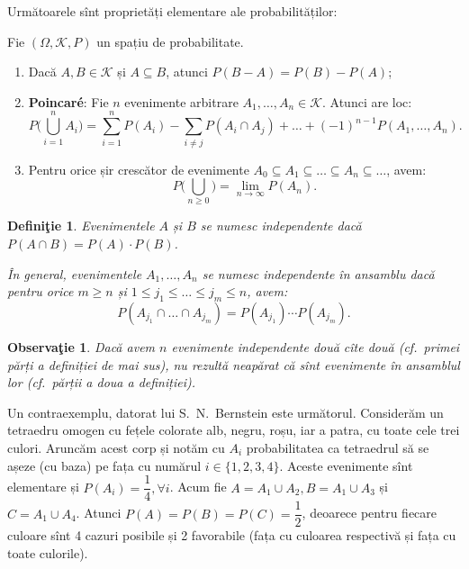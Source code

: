\documentclass[12pt,a4paper]{article}
\newcommand\kal{\mathcal}
\newcommand\seq{\subseteq}
\theoremstyle{dotless}
\theoremstyle{dotlessdr}
\newtheorem{definition}{Defini\c{t}ie}
\newtheorem{remark}{Observa\c{t}ie}
\begin{document}
\vspace{1cm}

Următoarele sînt proprietăți elementare ale probabilităților:

Fie $ (\Omega, \kal{K}, P) $ un spațiu de probabilitate.
\begin{enumerate}[(1)]
\item Dacă $ A, B \in \kal{K} $ și $ A \seq B $, atunci $ P(B - A) = P(B) - P(A) $;
\item \textbf{Poincar\'{e}}: Fie $ n $ evenimente arbitrare $ A_1, \dots, A_n \in \kal{K} $.
  Atunci are loc:
  \[
    P \Big( \bigcup_{i = 1}^n A_i \Big) = \sum_{i = 1}^n P(A_i) - \sum_{i \neq j} P(A_i \cap A_j) + %
    \dots + (-1)^{n-1} P(A_1, \dots, A_n).
  \]
\item Pentru orice șir crescător de evenimente $ A_0 \seq A_1 \seq \dots \seq A_n \seq \dots $,
  avem:
  \[
    P \Big( \bigcup_{n\geq 0} \Big) = \lim_{n \to \infty} P(A_n).
  \]
\end{enumerate}

\begin{definition}\label{def:ev-indep}
  Evenimentele $ A $ și $ B $ se numesc \emph{independente} dacă $ P(A \cap B) = P(A) \cdot P(B) $.

  În general, evenimentele $ A_1, \dots, A_n $ se numesc \emph{independente în ansamblu}
  dacă pentru orice $ m \geq n $ și $ 1 \leq j_1 \leq \dots \leq j_m \leq n $, avem:
  \[
    P(A_{j_1} \cap \dots \cap A_{j_m}) = P(A_{j_1}) \cdots P(A_{j_m}).
  \]
\end{definition}

\begin{remark}\label{rk:indep-ans}
  Dacă avem $ n $ evenimente independente două cîte două (cf.\ primei părți a definiției
  de mai sus), nu rezultă neapărat că sînt evenimente în ansamblul lor (cf.\ părții a
  doua a definiției).
\end{remark}

Un contraexemplu, datorat lui S.\ N.\ Bernstein este următorul. Considerăm un tetraedru
omogen cu fețele colorate alb, negru, roșu, iar a patra, cu toate cele trei culori.
Aruncăm acest corp și notăm cu $ A_i $ probabilitatea ca tetraedrul să se așeze (cu baza)
pe fața cu numărul $ i \in \{ 1, 2, 3, 4 \} $. Aceste evenimente sînt elementare și
$ P(A_i) = \dfrac{1}{4}, \forall i $. Acum fie $ A = A_1 \cup A_2, B = A_1 \cup A_3 $ și
$ C = A_1 \cup A_4 $. Atunci $ P(A) = P(B) = P(C) = \dfrac{1}{2} $, deoarece pentru fiecare
culoare sînt 4 cazuri posibile și 2 favorabile (fața cu culoarea respectivă și fața cu
toate culorile).
\end{document}
